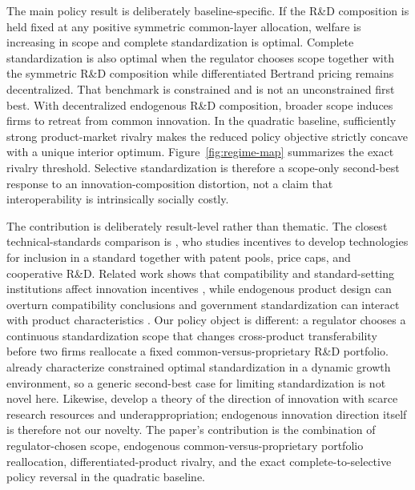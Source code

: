 The main policy result is deliberately baseline-specific. If the R\&D composition is held fixed at any positive symmetric common-layer allocation, welfare is increasing in scope and complete standardization is optimal. Complete standardization is also optimal when the regulator chooses scope together with the symmetric R\&D composition while differentiated Bertrand pricing remains decentralized. That benchmark is constrained and is not an unconstrained first best. With decentralized endogenous R\&D composition, broader scope induces firms to retreat from common innovation. In the quadratic baseline, sufficiently strong product-market rivalry makes the reduced policy objective strictly concave with a unique interior optimum. Figure~\ref{fig:regime-map} summarizes the exact rivalry threshold. Selective standardization is therefore a scope-only second-best response to an innovation-composition distortion, not a claim that interoperability is intrinsically socially costly.

The contribution is deliberately result-level rather than thematic. The closest technical-standards comparison is \citet{Llanes2024}, who studies incentives to develop technologies for inclusion in a standard together with patent pools, price caps, and cooperative R\&D. Related work shows that compatibility and standard-setting institutions affect innovation incentives \citep{BondSmith2019,MaruyamaZennyo2017,HeywoodWangYe2022}, while endogenous product design can overturn compatibility conclusions \citep{Boom2001} and government standardization can interact with product characteristics \citep{Ruiz2004}. Our policy object is different: a regulator chooses a continuous standardization scope that changes cross-product transferability before two firms reallocate a fixed common-versus-proprietary R\&D portfolio. \citet{AcemogluGanciaZilibotti2012} already characterize constrained optimal standardization in a dynamic growth environment, so a generic second-best case for limiting standardization is not novel here. Likewise, \citet{BryanLemus2017} develop a theory of the direction of innovation with scarce research resources and underappropriation; endogenous innovation direction itself is therefore not our novelty. The paper's contribution is the combination of regulator-chosen scope, endogenous common-versus-proprietary portfolio reallocation, differentiated-product rivalry, and the exact complete-to-selective policy reversal in the quadratic baseline.

